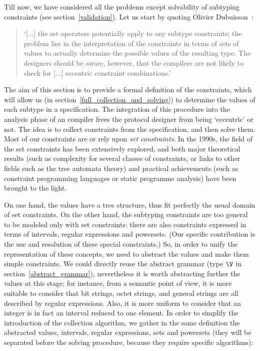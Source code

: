 
Till now, we have considered all the problems except solvability of
subtyping constraints (see section~\ref{validation}). Let us start by
quoting Olivier Dubuisson~\cite[\S{13.11}]{Dubuisson:2000}:

\begin{quotation}
`[...] the set operators potentially apply to any subtype constraints;
the problem lies in the interpretation of the constraints in terms of
sets of values to actually determine the possible values of the
resulting type. The designers should be aware, however, that the \ASN
compilers are not likely to check for [...] eccentric constraint
combinations.'
\end{quotation}

The aim of this section is to provide a formal definition of
the constraints, which will allow us (in
section~\ref{full_collection_and_solving}) to determine the values of
each subtype in a specification. The integration of this procedure into
the analysis phase of an \ASN compiler frees the protocol designer
from being `eccentric' or not. The idea is to collect constraints
from the specification, and then solve them. Most of our constraints
are or rely upon \emph{set constraints}. In the 1990s, the field of
the set constraints has been extensively explored, and both major
theoretical results (such as complexity for several classes of
constraints, or links to other fields such as the tree automata
theory) and practical achievements (such as constraint programming
languages or static programme analysis) have been brought to the
light.

On one hand, the \ASN values have a tree structure, thus fit perfectly
the usual domain of set constraints. On the other hand, the \ASN
subtyping constraints are too general to be modeled only with set
constraints: there are also constraints expressed in terms of
intervals, regular expressions and powersets. (Our specific
contribution is the use and resolution of these special constraints.)
So, in order to unify the representation of these concepts, we need to
abstract the values and make them simple constraints. We could
directly reuse the abstract grammar (type $\V$ in
section~\ref{abstract_grammar}), nevertheless it is worth abstracting
further the values at this stage; for instance, from a semantic
point of view, it is more suitable to consider that bit strings, octet
strings, and general strings are all described by regular expressions.
Also, it is more uniform to consider that an integer is in fact an
interval reduced to one element. In order to simplify the introduction
of the collection algorithm, we gather in the same definition the
abstracted values, intervals, regular expressions, sets and powersets
(they will be separated before the solving procedure, because they
require specific algorithms):

